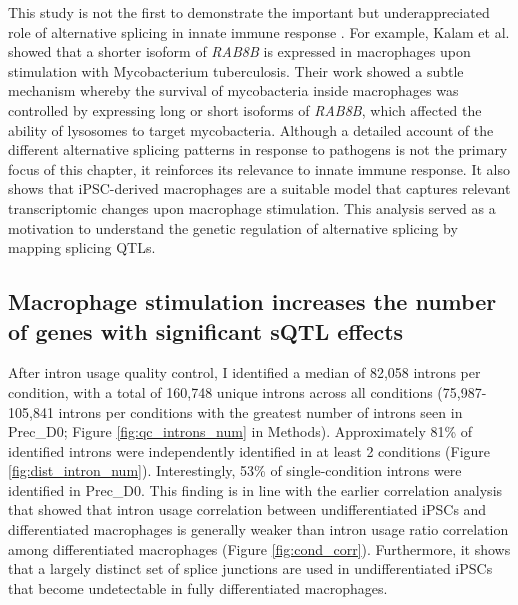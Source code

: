 This study is not the first to demonstrate the important but underappreciated role of alternative splicing in innate immune response \cite{Wagner2021-fl,Kalam2017-qa}. For example, Kalam et al. \cite{Kalam2017-qa} showed that a shorter isoform of \textit{RAB8B} is expressed in macrophages upon stimulation with Mycobacterium tuberculosis. Their work showed a subtle mechanism whereby the survival of mycobacteria inside macrophages was controlled by expressing long or short isoforms of \textit{RAB8B}, which affected the ability of lysosomes to target mycobacteria. Although a detailed account of the different alternative splicing patterns in response to pathogens is not the primary focus of this chapter, it reinforces its relevance to innate immune response. It also shows that iPSC-derived macrophages are a suitable model that captures relevant transcriptomic changes upon macrophage stimulation. This analysis served as a motivation to understand the genetic regulation of alternative splicing by mapping splicing QTLs.\\

\subsection{Macrophage stimulation increases the number of genes with significant sQTL effects }




After intron usage quality control, I identified a median of 82,058 introns per condition, with a total of 160,748 unique introns across all conditions (75,987-105,841 introns per conditions with the greatest  number of introns seen in Prec\_D0; Figure \ref{fig:qc_introns_num} in Methods). Approximately 81\% of identified introns were independently identified in at least 2 conditions (Figure \ref{fig:dist_intron_num}). Interestingly, 53\% of single-condition introns were identified in Prec\_D0. This finding is in line with the earlier correlation analysis that showed that intron usage correlation between undifferentiated iPSCs and differentiated macrophages is generally weaker than intron usage ratio correlation among differentiated macrophages (Figure \ref{fig:cond_corr}). Furthermore, it shows that a largely distinct set of splice junctions are used in undifferentiated iPSCs that become undetectable in fully differentiated macrophages. \\

